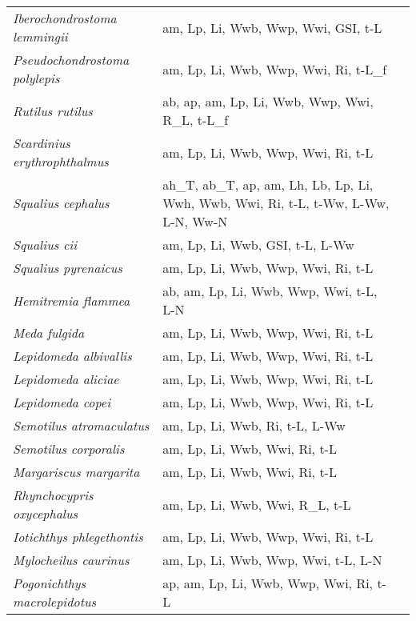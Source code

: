 {\begin{longtable}[c]{p{3.5cm}p{5.5cm}p{5.5cm}}
\emph{Iberochondrostoma lemmingii} &  am, Lp, Li, Wwb, Wwp, Wwi, GSI, t-L & \citet{VelaRinc1990} \\
\emph{Pseudochondrostoma polylepis} &  am, Lp, Li, Wwb, Wwp, Wwi, Ri, t-L\_f & \citet{HerrFern1994} \\
\emph{Rutilus rutilus} &  ab, ap, am, Lp, Li, Wwb, Wwp, Wwi, R\_L, t-L\_f & \citet{Laak2010,RaczCzer2008} \\
\emph{Scardinius erythrophthalmus} &  am, Lp, Li, Wwb, Wwp, Wwi, Ri, t-L & \citet{KennFitz1974,PatiNadj2010} \\
\emph{Squalius cephalus} &  ah\_T, ab\_T, ap, am, Lh, Lb, Lp, Li, Wwh, Wwb, Wwi, Ri, t-L, t-Ww, L-Ww, L-N, Ww-N & \citet{KuprMamc2011,Sasi2004,KiliBece2016,Calt2000,KocErdo2007} \\
\emph{Squalius cii} &  am, Lp, Li, Wwb, GSI, t-L, L-Ww & \citet{EconDaou1991,KocErdo2007} \\
\emph{Squalius pyrenaicus} &  am, Lp, Li, Wwb, Wwp, Wwi, Ri, t-L & \citet{FernHerr1995} \\
\emph{Hemitremia flammea} &  ab, am, Lp, Li, Wwb, Wwp, Wwi, t-L, L-N & \citet{Mull2012,Soss1990} \\
\emph{Meda fulgida} &  am, Lp, Li, Wwb, Wwp, Wwi, Ri, t-L & \citet{BarbWill1970} \\
\emph{Lepidomeda albivallis} &  am, Lp, Li, Wwb, Wwp, Wwi, Ri, t-L & \citet{ScopHarv2004,BillTjar2011} \\
\emph{Lepidomeda aliciae} &  am, Lp, Li, Wwb, Wwp, Wwi, Ri, t-L & \citet{BillTjar2011} \\
\emph{Lepidomeda copei} &  am, Lp, Li, Wwb, Wwp, Wwi, Ri, t-L & \citet{JohnBelk1995} \\
\emph{Semotilus atromaculatus} &  am, Lp, Li, Wwb, Ri, t-L, L-Ww & \citet{HensSper2006} \\
\emph{Semotilus corporalis} &  am, Lp, Li, Wwb, Wwi, Ri, t-L & \citet{Reed1971} \\
\emph{Margariscus margarita} &  am, Lp, Li, Wwb, Wwi, Ri, t-L & \citet{FavaTsai1974} \\
\emph{Rhynchocypris oxycephalus} &  am, Lp, Li, Wwb, Wwi, R\_L, t-L & \citet{LingJuan2015} \\
\emph{Iotichthys phlegethontis} &  am, Lp, Li, Wwb, Wwp, Wwi, Ri, t-L & \citet{MillBelk2004,HankBelk2004} \\
\emph{Mylocheilus caurinus} &  am, Lp, Li, Wwb, Wwp, Wwi, t-L, L-N & \citet{Scot1952,Cart1959,MoylBaxt2004} \\
\emph{Pogonichthys macrolepidotus} &  ap, am, Lp, Li, Wwb, Wwp, Wwi, Ri, t-L & \citet{MoylBaxt2004} \\

\end{longtable}}
